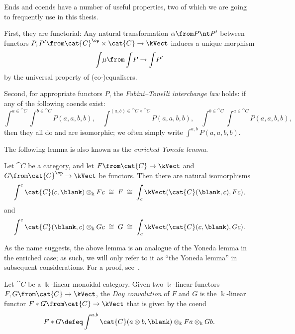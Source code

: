 \begin{remark}
  Ends and coends have a number of useful properties,
  two of which we are going to frequently use in this thesis.

  First, they are functorial: Any natural transformation \(\alpha \from P \nt P'\) between functors
  \(P, P' \from\cat{C}^{\op} \times\cat{C} \to \kVect\) induces a unique morphism
  \[
    \int\!\mu \from \int\! P \to  \int\! P'
  \]
  by the universal property of (co-)equalisers.

  Second, for appropriate functors \(P\),
  the \emph{Fubini–Tonelli interchange law} holds:
  if any of the following coends exist:
  \[
    \int^{a \in \cat{C}} \int^{b \in \cat{C}}\! P(a, a, b, b), \quad
    \int^{(a, b) \in \cat{C} \times \cat{C}}\! P(a, a, b, b), \quad
    \int^{b \in \cat{C}} \int^{a \in \cat{C}}\! P(a, a, b, b),
  \]
  then they all do and are isomorphic;
  we often simply write \(\int^{a,b} P(a,a,b,b)\).
\end{remark}

The following lemma is also known as the \emph{enriched Yoneda lemma}.

\begin{lemma}\label{lem:enriched-yoneda}
  Let \(\cat{C}\) be a category,
  and let
  \(F \from \cat{C} \to \kVect\) and \(G \from \cat{C}^{\op} \to \kVect\) be functors.
  Then there are natural isomorphisms
  \begin{equation}\label{eq:coYoneda-covariant}
    \int^{c} \cat{C}(c, \blank) \otimes_{\Bbbk} Fc
    \;\cong\; F
    \;\cong\; \int_{c} \kVect(\cat{C}(\blank, c), Fc),
  \end{equation}
  and
  \begin{equation}\label{eq:coYoneda-contravariant}
    \int^{c} \cat{C}(\blank, c) \otimes_{\Bbbk} Gc
    \;\cong\; G
    \;\cong\; \int_{c} \kVect(\cat{C}(c, \blank), Gc).
  \end{equation}
\end{lemma}

As the name suggests,
the above lemma is an analogue of the Yoneda lemma in the enriched case;
as such, we will only refer to it as ``the Yoneda lemma'' in subsequent considerations.
For a proof, see~\cite[Section~2.4]{kelly05:basic}.

\begin{definition}\label{def:day-convolution}
  Let \(\cat{C}\) be a \(\Bbbk\)\hyp{}linear monoidal category.
  Given two \(\Bbbk\)\hyp{}linear functors \(F, G\from \cat{C}\to \kVect\),
  the \emph{Day convolution} of \(F\) and \(G\) is the \(\Bbbk\)\hyp{}linear functor
  \(F * G\from \cat{C} \to \kVect\) that is given by the coend
  \[
    F * G \defeq \int^{a, b} \cat{C}(a \otimes b, \blank) \otimes_{\Bbbk} Fa \otimes_{\Bbbk} Gb.
  \]
\end{definition}

